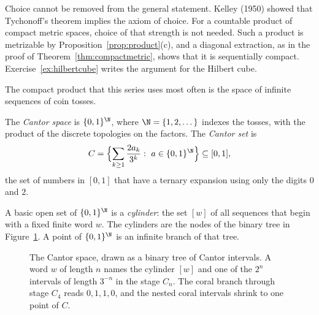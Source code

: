\begin{remark}
Choice cannot be removed from the general statement. Kelley (1950) showed that Tychonoff's theorem implies the axiom of choice. For a countable product of compact metric spaces, choice of that strength is not needed. Such a product is metrizable by Proposition~\ref{prop:product}(c), and a diagonal extraction, as in the proof of Theorem~\ref{thm:compactmetric}, shows that it is sequentially compact. Exercise~\ref{ex:hilbertcube} writes the argument for the Hilbert cube.
\end{remark}

The compact product that this series uses most often is the space of infinite sequences of coin tosses.

\begin{definition}
The \emph{Cantor space} is $\{0,1\}^\N$, where $\N=\{1,2,\dots\}$ indexes the tosses, with the product of the discrete topologies on the factors. The \emph{Cantor set} is
\[C=\Bigl\{\sum_{k\ge1}\frac{2a_k}{3^k}:\ a\in\{0,1\}^\N\Bigr\}\subseteq[0,1],\]
the set of numbers in $[0,1]$ that have a ternary expansion using only the digits $0$ and $2$.
\end{definition}

A basic open set of $\{0,1\}^\N$ is a \emph{cylinder}: the set $[w]$ of all sequences that begin with a fixed finite word $w$. The cylinders are the nodes of the binary tree in Figure~\ref{fig:cantortree}. A point of $\{0,1\}^\N$ is an infinite branch of that tree.

\begin{figure}[ht]
\centering
{}
\caption{The Cantor space, drawn as a binary tree of Cantor intervals. A word $w$ of length $n$ names the cylinder $[w]$ and one of the $2^n$ intervals of length $3^{-n}$ in the stage $C_n$. The coral branch through stage $C_4$ reads $0,1,1,0$, and the nested coral intervals shrink to one point of $C$.}
\label{fig:cantortree}
\end{figure}

